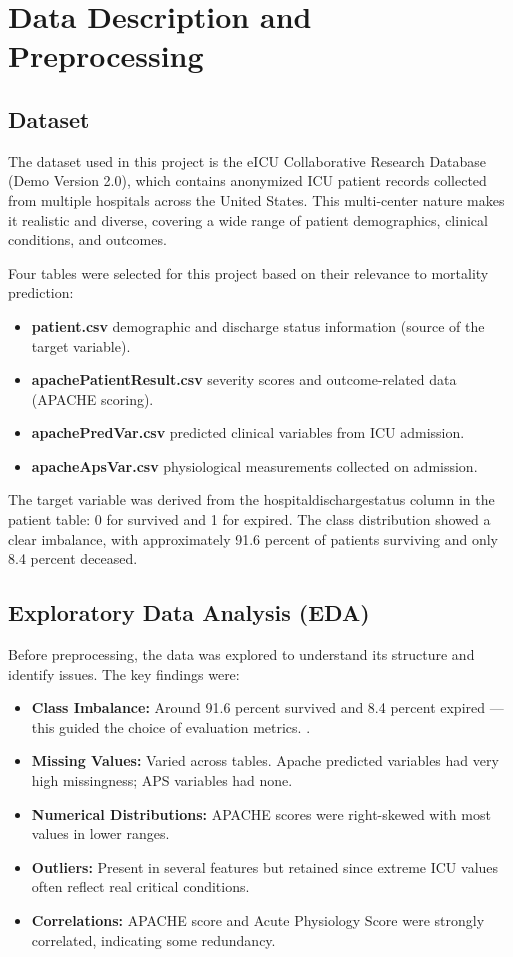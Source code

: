 \documentclass[11pt]{article}
\begin{document}
\section{Data Description and Preprocessing}

\subsection{Dataset}
The dataset used in this project is the eICU Collaborative Research Database (Demo Version 2.0), which contains anonymized ICU patient records collected from multiple hospitals across the United States. This multi-center nature makes it realistic and diverse, covering a wide range of patient demographics, clinical conditions, and outcomes.

Four tables were selected for this project based on their relevance to mortality prediction:

\begin{itemize}
    \item \textbf{patient.csv } demographic and discharge status information (source of the target variable).
    \item \textbf{apachePatientResult.csv } severity scores and outcome-related data (APACHE scoring).
    \item \textbf{apachePredVar.csv } predicted clinical variables from ICU admission.
    \item \textbf{apacheApsVar.csv } physiological measurements collected on admission.
    \end{itemize}
The target variable was derived from the hospitaldischargestatus column in the patient table: 0 for survived and 1 for expired. The class distribution showed a clear imbalance, with approximately 91.6 percent of patients surviving and only 8.4 percent deceased.

\subsection{Exploratory Data Analysis (EDA)
}
Before preprocessing, the data was explored to understand its structure and identify issues. The key findings were:
\begin{itemize}
    \item \textbf{Class Imbalance:} Around 91.6 percent survived and 8.4 percent expired — this guided the choice of evaluation metrics.
.
    \item \textbf{Missing Values:  } Varied across tables. Apache predicted variables had very high missingness; APS variables had none.
    \item \textbf{Numerical Distributions:} APACHE scores were right-skewed with most values in lower ranges.
    \item \textbf{Outliers:  } Present in several features but retained since extreme ICU values often reflect real critical conditions.
    \item \textbf{Correlations:  } APACHE score and Acute Physiology Score were strongly correlated, indicating some redundancy.


    \end{itemize}
\end{document}
